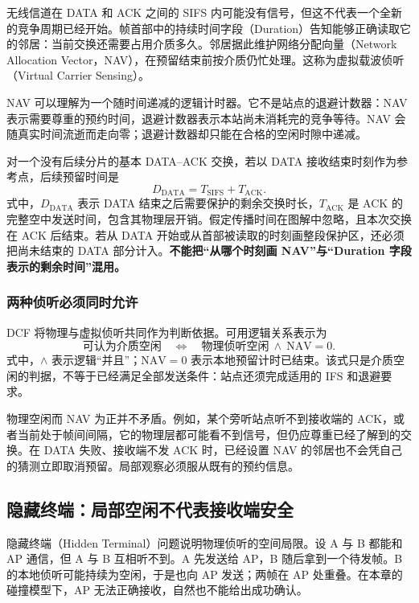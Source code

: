无线信道在 DATA 和 ACK 之间的 SIFS 内可能没有信号，但这不代表一个全新的竞争周期已经开始。帧首部中的持续时间字段（Duration）告知能够正确读取它的邻居：当前交换还需要占用介质多久。邻居据此维护网络分配向量（Network Allocation Vector，NAV），在预留结束前按介质仍忙处理。这称为虚拟载波侦听（Virtual Carrier Sensing）。

NAV 可以理解为一个随时间递减的逻辑计时器。它不是站点的退避计数器：NAV 表示需要尊重的预约时间，退避计数器表示本站尚未消耗完的竞争等待。NAV 会随真实时间流逝而走向零；退避计数器却只能在合格的空闲时隙中递减。

对一个没有后续分片的基本 DATA--ACK 交换，若以 DATA 接收结束时刻作为参考点，后续预留时间是
\begin{equation}
D_{\mathrm{DATA}}=T_{\mathrm{SIFS}}+T_{\mathrm{ACK}}.
\label{eq:duration-data}
\end{equation}
式中，$D_{\mathrm{DATA}}$ 表示 DATA 结束之后需要保护的剩余交换时长，$T_{\mathrm{ACK}}$ 是 ACK 的完整空中发送时间，包含其物理层开销。假定传播时间在图解中忽略，且本次交换在 ACK 后结束。若从 DATA 开始或从首部被读取的时刻画整段保护区，还必须把尚未结束的 DATA 部分计入。\textbf{不能把“从哪个时刻画 NAV”与“Duration 字段表示的剩余时间”混用。}

\subsubsection{两种侦听必须同时允许}

DCF 将物理与虚拟侦听共同作为判断依据。可用逻辑关系表示为
\begin{equation}
\text{可认为介质空闲}
\quad\Longleftrightarrow\quad
\text{物理侦听空闲}\ \land\ \mathrm{NAV}=0.
\label{eq:two-sensing}
\end{equation}
式中，$\land$ 表示逻辑“并且”；$\mathrm{NAV}=0$ 表示本地预留计时已结束。该式只是介质空闲的判据，不等于已经满足全部发送条件：站点还须完成适用的 IFS 和退避要求。

物理空闲而 NAV 为正并不矛盾。例如，某个旁听站点听不到接收端的 ACK，或者当前处于帧间间隔，它的物理层都可能看不到信号，但仍应尊重已经了解到的交换。在 DATA 失败、接收端不发 ACK 时，已经设置 NAV 的邻居也不会凭自己的猜测立即取消预留。局部观察必须服从既有的预约信息。

\subsection{隐藏终端：局部空闲不代表接收端安全}

隐藏终端（Hidden Terminal）问题说明物理侦听的空间局限。设 A 与 B 都能和 AP 通信，但 A 与 B 互相听不到。A 先发送给 AP，B 随后拿到一个待发帧。B 的本地侦听可能持续为空闲，于是也向 AP 发送；两帧在 AP 处重叠。在本章的碰撞模型下，AP 无法正确接收，自然也不能给出成功确认。

